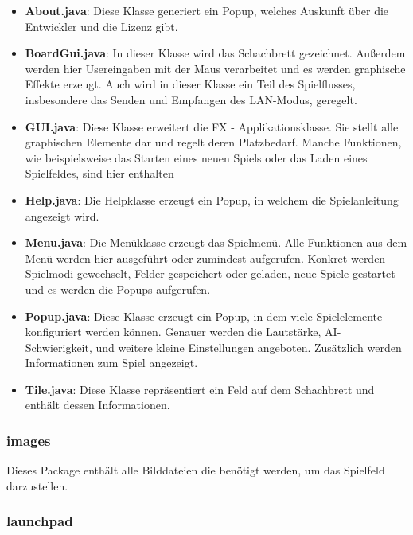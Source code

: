 \documentclass[12pt,a4paper]{article}
\begin{document}
\begin{itemize}

	\item{\textbf{About.java}: Diese Klasse generiert ein Popup, welches Auskunft über die Entwickler und die Lizenz gibt. }
	
	\item{\textbf{BoardGui.java}: In dieser Klasse wird das Schachbrett gezeichnet. Außerdem werden hier Usereingaben mit der Maus verarbeitet und es werden graphische Effekte erzeugt. Auch wird in dieser Klasse ein Teil des Spielflusses, insbesondere das Senden und Empfangen des LAN-Modus, geregelt. }
	
	\item{\textbf{GUI.java}: Diese Klasse erweitert die FX - Applikationsklasse. Sie stellt alle graphischen Elemente dar und regelt deren Platzbedarf. Manche Funktionen, wie beispielsweise das Starten eines neuen Spiels oder das Laden eines Spielfeldes, sind hier enthalten }
	
	\item{\textbf{Help.java}: Die Helpklasse erzeugt ein Popup, in welchem die Spielanleitung angezeigt wird.}
	
	\item{\textbf{Menu.java}: Die Menüklasse erzeugt das Spielmenü. Alle Funktionen aus dem Menü werden hier ausgeführt oder zumindest aufgerufen. Konkret werden Spielmodi gewechselt, Felder gespeichert oder geladen, neue Spiele gestartet und es werden die Popups aufgerufen.}
	
	\item{\textbf{Popup.java}: Diese Klasse erzeugt ein Popup, in dem viele Spielelemente konfiguriert werden können. Genauer werden die Lautstärke, AI-Schwierigkeit, und weitere kleine Einstellungen angeboten. Zusätzlich werden Informationen zum Spiel angezeigt. }
	
	\item{\textbf{Tile.java}: Diese Klasse repräsentiert ein Feld auf dem Schachbrett und enthält dessen Informationen.}

\end{itemize}

\subsubsection{images}

Dieses Package enthält alle Bilddateien die benötigt werden, um das Spielfeld darzustellen. 

\subsubsection{launchpad}
\end{document}
